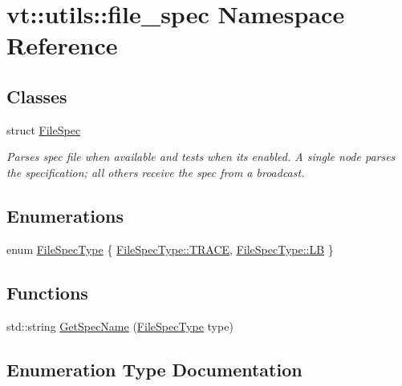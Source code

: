 \hypertarget{namespacevt_1_1utils_1_1file__spec}{}\section{vt\+:\+:utils\+:\+:file\+\_\+spec Namespace Reference}
\label{namespacevt_1_1utils_1_1file__spec}
\subsection*{Classes}
\begin{DoxyCompactItemize}
\item 
struct \hyperlink{structvt_1_1utils_1_1file__spec_1_1_file_spec}{File\+Spec}
\begin{DoxyCompactList}\small\item\em Parses spec file when available and tests when its enabled. A single node parses the specification; all others receive the spec from a broadcast. \end{DoxyCompactList}\end{DoxyCompactItemize}
\subsection*{Enumerations}
\begin{DoxyCompactItemize}
\item 
enum \hyperlink{namespacevt_1_1utils_1_1file__spec_adc8912eb2949ca15d0f29afc0342f71e}{File\+Spec\+Type} \{ \hyperlink{namespacevt_1_1utils_1_1file__spec_adc8912eb2949ca15d0f29afc0342f71ea2d3e4144aa384b18849ab9a8abad74d6}{File\+Spec\+Type\+::\+T\+R\+A\+CE}, 
\hyperlink{namespacevt_1_1utils_1_1file__spec_adc8912eb2949ca15d0f29afc0342f71eac951270e425b15fc20c64da4341c1d89}{File\+Spec\+Type\+::\+LB}
 \}
\end{DoxyCompactItemize}
\subsection*{Functions}
\begin{DoxyCompactItemize}
\item 
std\+::string \hyperlink{namespacevt_1_1utils_1_1file__spec_aeb055b7b801483ca725b65559cf2e337}{Get\+Spec\+Name} (\hyperlink{namespacevt_1_1utils_1_1file__spec_adc8912eb2949ca15d0f29afc0342f71e}{File\+Spec\+Type} type)
\end{DoxyCompactItemize}


\subsection{Enumeration Type Documentation}
\mbox{\label{namespacevt_1_1utils_1_1file__spec_adc8912eb2949ca15d0f29afc0342f71e}} 
